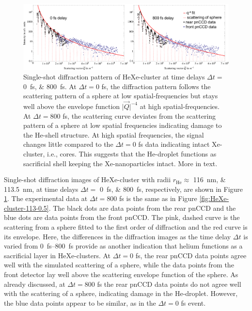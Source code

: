 \begin{figure}
	\centering
		\includegraphics[width=1.00\textwidth]{images/results/HeXe-comparison-0-800-fs.png}
	\caption[Single-shot diffraction patterns of HeXe-cluster at different time delays]{Single-shot diffraction pattern of HeXe-cluster at time delays $\Delta t =$ 
	\SIlist{0;800}{\femto\second}. At $\Delta t=0$ fs, the diffraction pattern follows the scattering pattern of a sphere at low spatial-frequencies but stays well above the envelope function $\lvert\vec{Q}\rvert^{-4}$ at high spatial-frequencies. At $\Delta t=800$ fs, the scattering curve deviates from the scattering pattern of a sphere at low spatial frequencies indicating damage to the He-shell structure. At high spatial frequencies, the signal changes little compared to the $\Delta t=0$ fs data indicating intact Xe-cluster, i.e., cores. This suggests that the He-droplet functions as sacrificial shell keeping the Xe-nanoparticles intact. More in text.}
	\label{fig:HeXe-comparison-0-800-fs}
\end{figure}
%
Single-shot diffraction images of HeXe-cluster with radii $r_{\text{He}}\approx$ \SIlist{116;113.5}{\nano\meter}, at time delays $\Delta t =$ \SIlist{0;800}{\femto\second}, respectively, are shown in Figure \ref{fig:HeXe-comparison-0-800-fs}. The experimental data at $\Delta t = 800$ fs is the same as in Figure \ref{fig:HeXe-cluster-113-0.5}. The black dots are data points from the rear pnCCD and the blue dots are data points from the front pnCCD. The pink, dashed curve is the scattering from a sphere fitted to the first order of diffraction and the red curve is its envelope. Here, the differences in the diffraction images as the time delay $\Delta t$ is varied from \SIrange{0}{800}{\femto\second} provide as another indication that helium functions as a sacrificial layer in HeXe-clusters. At $\Delta t=0$ fs, the rear pnCCD data points agree well with the simulated scattering of a sphere, while the data points from the front detector lay well above the scattering envelope function of the sphere. As already discussed, at $\Delta t = 800$ fs the rear pnCCD data points do not agree well with the scattering of a sphere, indicating damage in the He-droplet. However, the blue data points appear to be similar, as in the $\Delta t=0$ fs event.\\[1\baselineskip]
